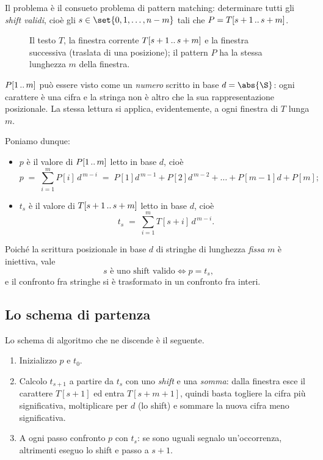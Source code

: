 Il problema è il consueto problema di pattern matching: determinare tutti gli \emph{shift
validi}, cioè gli $s \in \set{0,1,\dots,n-m}$ tali che $P = T[s+1\,..\,s+m]$.

\begin{figure}[H]\centering
\caption{Il testo $T$, la finestra corrente $T[s+1\,..\,s+m]$ e la finestra successiva
(traslata di una posizione); il pattern $P$ ha la stessa lunghezza $m$ della finestra.}
\label{fig:kr-finestra-testo}
\end{figure}

\begin{osservazione}
$P[1\,..\,m]$ può essere visto come un \emph{numero} scritto in base $d = \abs{\S}$: ogni
carattere è una cifra e la stringa non è altro che la sua rappresentazione posizionale. La
stessa lettura si applica, evidentemente, a ogni finestra di $T$ lunga $m$.
\end{osservazione}

Poniamo dunque:
\begin{itemize}
  \item $p$ è il valore di $P[1\,..\,m]$ letto in base $d$, cioè
    \[
      p \;=\; \sum_{i=1}^{m} P[i]\, d^{\,m-i}
        \;=\; P[1]d^{\,m-1} + P[2]d^{\,m-2} + \dots + P[m-1]d + P[m];
    \]
  \item $t_s$ è il valore di $T[s+1\,..\,s+m]$ letto in base $d$, cioè
    \[
      t_s \;=\; \sum_{i=1}^{m} T[s+i]\, d^{\,m-i}.
    \]
\end{itemize}

Poiché la scrittura posizionale in base $d$ di stringhe di lunghezza \emph{fissa} $m$ è
iniettiva, vale
\[
  s \text{ è uno shift valido} \iff p = t_s,
\]
e il confronto fra stringhe si è trasformato in un confronto fra interi.

\subsection{Lo schema di partenza}

Lo schema di algoritmo che ne discende è il seguente.
\begin{enumerate}
  \item Inizializzo $p$ e $t_0$.
  \item Calcolo $t_{s+1}$ a partire da $t_s$ con uno \emph{shift} e una \emph{somma}: dalla
    finestra esce il carattere $T[s+1]$ ed entra $T[s+m+1]$, quindi basta togliere la cifra
    più significativa, moltiplicare per $d$ (lo shift) e sommare la nuova cifra meno
    significativa.
  \item A ogni passo confronto $p$ con $t_s$: se sono uguali segnalo un'occorrenza,
    altrimenti eseguo lo shift e passo a $s+1$.
\end{enumerate}

